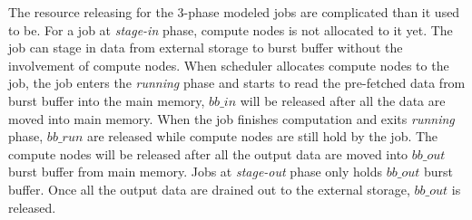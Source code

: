 

The resource releasing for the 3-phase modeled jobs are complicated than it used to be. 
For a job at \textit{stage-in} phase, compute nodes is not allocated to it yet. 
The job can stage in data from external storage to burst buffer without the involvement of compute nodes.
When scheduler allocates compute nodes to the job, the job enters the \textit{running} phase 
and starts to read the pre-fetched data from burst buffer into the main memory, 
$bb\_in$ will be released after all the data are moved into main memory. 
When the job finishes computation and exits \textit{running} phase, 
$bb\_run$ are released while compute nodes are still hold by the job. 
The compute nodes will be released after all the output data are moved into $bb\_out$ burst buffer from main memory.
Jobs at \textit{stage-out} phase only holds $bb\_out$ burst buffer. 
Once all the output data are drained out to the external storage,  
$bb\_out$ is released.




